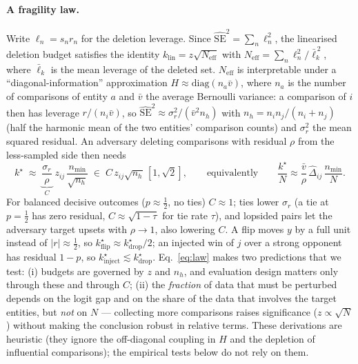 \paragraph{A fragility law.}
Write $\ell_n=s_nr_n$ for the deletion leverage. Since $\widehat{\mathrm{SE}}^2=\sum_n\ell_n^2$, the linearised deletion budget satisfies the identity
$k_{\mathrm{lin}}=z\sqrt{N_{\mathrm{eff}}}$ with $N_{\mathrm{eff}}=\sum_n\ell_n^2/\bar\ell_k^{\,2}$, where $\bar\ell_k$ is the mean leverage of the deleted set.
$N_{\mathrm{eff}}$ is interpretable under a ``diagonal-information'' approximation $H\approx\mathrm{diag}(n_a\bar v)$, where $n_a$ is the number of comparisons of entity $a$ and $\bar v$ the average Bernoulli variance: a comparison of $i$ then has leverage $r/(n_i\bar v)$, so $\widehat{\mathrm{SE}}^2\approx\sigma_r^2/(\bar v^2 n_h)$ with $n_h=n_in_j/(n_i+n_j)$ (half the harmonic mean of the two entities' comparison counts) and $\sigma_r^2$ the mean squared residual. An adversary deleting comparisons with residual $\rho$ from the less-sampled side then needs
\begin{equation}
k^\star\;\approx\;\underbrace{\frac{\sigma_r}{\rho}}_{C}\;z_{ij}\,\frac{n_{\min}}{\sqrt{n_h}}\;\in\;C\,z_{ij}\sqrt{n_h}\,[1,\sqrt2],
\qquad\text{equivalently}\qquad
\frac{k^\star}{N}\approx\frac{\bar v}{\rho}\,\hat\Delta_{ij}\,\frac{n_{\min}}{N}.
\label{eq:law}
\end{equation}
For balanced decisive outcomes ($p\approx\tfrac12$, no ties) $C\approx1$; ties lower $\sigma_r$ (a tie at $p=\tfrac12$ has zero residual, $C\approx\sqrt{1-\tau}$ for tie rate $\tau$), and lopsided pairs let the adversary target upsets with $\rho\to1$, also lowering $C$.
A flip moves $y$ by a full unit instead of $|r|\approx\tfrac12$, so $k^\star_{\text{flip}}\approx k^\star_{\text{drop}}/2$; an injected win of $j$ over a strong opponent has residual $1-p$, so $k^\star_{\text{inject}}\lesssim k^\star_{\text{drop}}$.
Eq.~\eqref{eq:law} makes two predictions that we test: (i) budgets are governed by $z$ and $n_h$, and evaluation design matters only through these and through $C$; (ii) the \emph{fraction} of data that must be perturbed depends on the logit gap and on the share of the data that involves the target entities, but \emph{not} on $N$ --- collecting more comparisons raises significance ($z\propto\sqrt N$) without making the conclusion robust in relative terms.
These derivations are heuristic (they ignore the off-diagonal coupling in $H$ and the depletion of influential comparisons); the empirical tests below do not rely on them.
